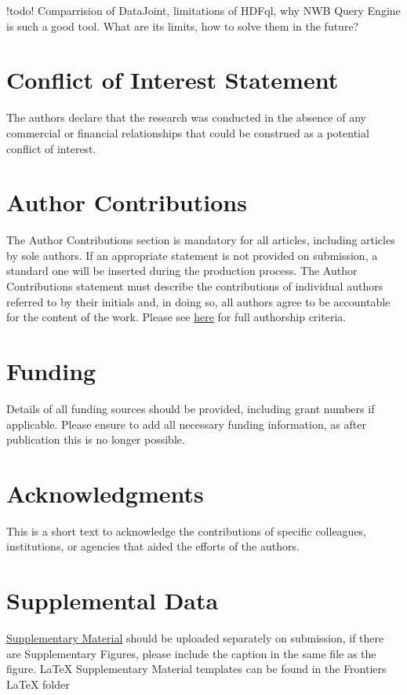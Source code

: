 \documentclass[utf8]{frontiersSCNS} %
\begin{document}
!todo! Comparrision of DataJoint, limitations of HDFql, why NWB Query Engine is such a good tool. What are its limits, how to solve them in the future?



\section*{Conflict of Interest Statement}

The authors declare that the research was conducted in the absence of any commercial or financial relationships that could be construed as a potential conflict of interest.

\section*{Author Contributions}

The Author Contributions section is mandatory for all articles, including articles by sole authors. If an appropriate statement is not provided on submission, a standard one will be inserted during the production process. The Author Contributions statement must describe the contributions of individual authors referred to by their initials and, in doing so, all authors agree to be accountable for the content of the work. Please see  \href{http://home.frontiersin.org/about/author-guidelines#AuthorandContributors}{here} for full authorship criteria.

\section*{Funding}
Details of all funding sources should be provided, including grant numbers if applicable. Please ensure to add all necessary funding information, as after publication this is no longer possible.

\section*{Acknowledgments}
This is a short text to acknowledge the contributions of specific colleagues, institutions, or agencies that aided the efforts of the authors.

\section*{Supplemental Data}
 \href{http://home.frontiersin.org/about/author-guidelines#SupplementaryMaterial}{Supplementary Material} should be uploaded separately on submission, if there are Supplementary Figures, please include the caption in the same file as the figure. LaTeX Supplementary Material templates can be found in the Frontiers LaTeX folder 
\end{document}
